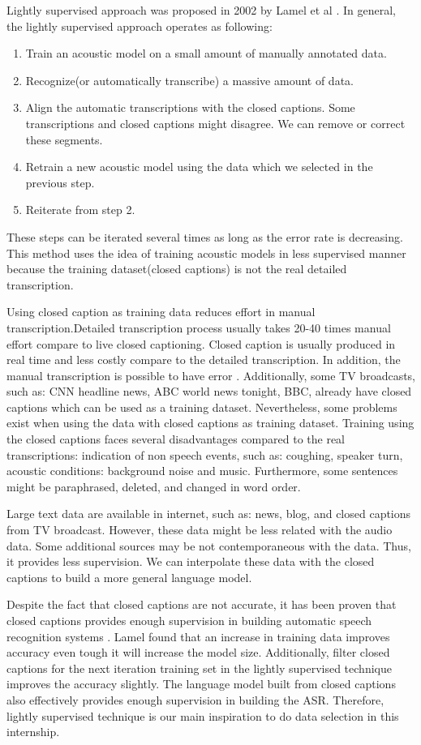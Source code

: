 Lightly supervised approach was proposed in 2002 by Lamel et al \cite{lightlySupervised}. 
In general, the lightly supervised approach operates as following:
\begin{enumerate}
\item Train an acoustic model on a small amount of manually annotated data. 
\item Recognize(or automatically transcribe) a massive amount of data.
\item Align the automatic transcriptions with the closed captions. Some transcriptions and closed captions might disagree. We can remove or correct these segments.
\item Retrain a new acoustic model using the data which we selected in the previous step. 
\item Reiterate from step 2.
\end{enumerate}
These steps can be iterated several times as long as the error rate is decreasing. This method uses the idea of training acoustic models in less supervised manner because the training dataset(closed captions) is not the real detailed transcription. 

Using closed caption as training data reduces effort in manual transcription.Detailed transcription process usually takes 20-40 times manual effort compare to live closed captioning. Closed caption is usually produced in real time and less costly compare to the detailed transcription. In addition, the manual transcription is possible to have error \cite{Barras2001}. Additionally, some TV broadcasts, such as: CNN headline news, ABC world news tonight, BBC, already have closed captions which can be used as a training dataset. Nevertheless, some problems exist when using the data with closed captions as training dataset. Training using  the closed captions faces several disadvantages compared to the real transcriptions: indication of non speech events, such as: coughing, speaker turn, acoustic conditions: background noise and music. Furthermore, some sentences might be paraphrased, deleted, and changed in word order. 

Large text data are available in internet, such as: news, blog, and closed captions from TV broadcast. However, these data might be less related with the audio data. Some additional sources may be not contemporaneous with the data. Thus, it provides less supervision. We can interpolate these data with the closed captions to build a more general language model.

Despite the fact that closed captions are not accurate, it has been proven that closed captions provides enough supervision in building automatic speech recognition systems \cite{lightlySupervised}. Lamel found that an increase in training data improves accuracy even tough it will increase the model size. Additionally, filter closed captions for the next iteration training set in the lightly supervised technique improves the accuracy slightly. The language model built from closed captions also effectively provides enough supervision in building the ASR. Therefore, lightly supervised technique is our main inspiration to do data selection in this internship.


